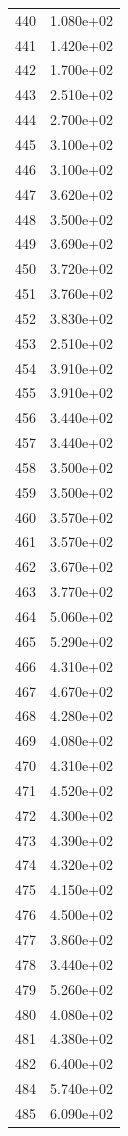 \documentclass[12pt]{article}
\begin{document}
\begin{longtable}{@{}cc@{}}
440 & 1.080e+02 \\
441 & 1.420e+02 \\
442 & 1.700e+02 \\
443 & 2.510e+02 \\
444 & 2.700e+02 \\
445 & 3.100e+02 \\
446 & 3.100e+02 \\
447 & 3.620e+02 \\
448 & 3.500e+02 \\
449 & 3.690e+02 \\
450 & 3.720e+02 \\
451 & 3.760e+02 \\
452 & 3.830e+02 \\
453 & 2.510e+02 \\
454 & 3.910e+02 \\
455 & 3.910e+02 \\
456 & 3.440e+02 \\
457 & 3.440e+02 \\
458 & 3.500e+02 \\
459 & 3.500e+02 \\
460 & 3.570e+02 \\
461 & 3.570e+02 \\
462 & 3.670e+02 \\
463 & 3.770e+02 \\
464 & 5.060e+02 \\
465 & 5.290e+02 \\
466 & 4.310e+02 \\
467 & 4.670e+02 \\
468 & 4.280e+02 \\
469 & 4.080e+02 \\
470 & 4.310e+02 \\
471 & 4.520e+02 \\
472 & 4.300e+02 \\
473 & 4.390e+02 \\
474 & 4.320e+02 \\
475 & 4.150e+02 \\
476 & 4.500e+02 \\
477 & 3.860e+02 \\
478 & 3.440e+02 \\
479 & 5.260e+02 \\
480 & 4.080e+02 \\
481 & 4.380e+02 \\
482 & 6.400e+02 \\
484 & 5.740e+02 \\
485 & 6.090e+02 \\

\end{longtable}
\end{document}
